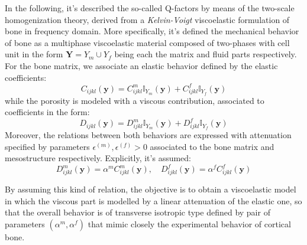 In the following, it's described the so-called Q-factors by means of the two-scale homogenization theory, derived from a \textit{Kelvin-Voigt} viscoelastic formulation of bone in frequency domain. More specifically, it's defined the mechanical behavior of bone as a multiphase viscoelastic material composed of two-phases with cell unit in the form $\mathbf{Y} = Y_{m} \cup Y_{f}$ being each the matrix and fluid parts respectively.
For the bone matrix, we associate an elastic behavior defined by the elastic coefficients:
\begin{equation*}
    C_{ijkl}(\mathbf{y}) = C_{ijkl}^m \mathbb{I}_{Y_m}(\mathbf{y}) + C_{ijkl}^f \mathbb{I}_{Y_f}(\mathbf{y})
\end{equation*}
while the porosity is modeled with a viscous contribution, associated to coefficients in the form:
\begin{equation*}
    D_{ijkl}(\mathbf{y}) =  D_{ijkl}^m \mathbb{I}_{Y_m}(\mathbf{y}) + D_{ijkl}^f \mathbb{I}_{Y_f}(\mathbf{y})
\end{equation*}
Moreover, the relations between both behaviors are expressed with attenuation specified by parameters $\epsilon^{(m)}, \epsilon^{(f)} >0$ associated to the bone matrix and mesostructure respectively. Explicitly, it's assumed:
\begin{equation*}
    D_{ijkl}^m(\mathbf{y}) = \alpha^{m} C_{ijkl}^m(\mathbf{y}) , \quad D_{ijkl}^f (\mathbf{y}) = \alpha^{f} C_{ijkl}^f(\mathbf{y})
\end{equation*}


\begin{rem}
By assuming this kind of relation, the objective is to obtain a viscoelastic model in which the viscous part is modelled by a linear attenuation of the elastic one, so that the overall behavior is of transverse isotropic type defined by pair of parameters $(\alpha^m, \alpha^f)$ that mimic closely the experimental behavior of cortical bone.
\end{rem}

